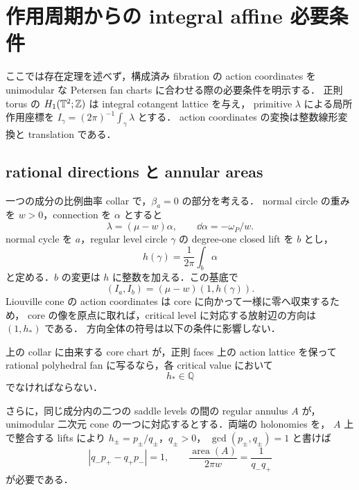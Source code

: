 \section{作用周期からの integral affine 必要条件}
\label{trop:action-conditions-section}

ここでは存在定理を述べず，構成済み fibration の action coordinates を
unimodular な Petersen fan charts に合わせる際の必要条件を明示する．
正則 torus の $H_1(\mathbb T^2;\mathbb Z)$ は integral cotangent lattice を与え，
primitive $\lambda$ による局所作用座標を
$I_\gamma=(2\pi)^{-1}\int_\gamma\lambda$ とする．
action coordinates の変換は整数線形変換と translation である．

\subsection{rational directions と annular areas}

一つの成分の比例曲率 collar で，$\beta_a=0$ の部分を考える．
normal circle の重みを $w>0$，connection を $\alpha$ とすると
\[
 \lambda=(\mu-w)\alpha,\qquad \dd\alpha=-\omega_P/w.
\]
normal cycle を $a$，regular level circle $\gamma$ の degree-one closed lift を $b$ とし，
\[
 h(\gamma)=\frac1{2\pi}\int_b\alpha
\]
と定める．$b$ の変更は $h$ に整数を加える．この基底で
\begin{equation}\label{trop:action-cone}
 (I_a,I_b)=(\mu-w)(1,h(\gamma)).
\end{equation}
Liouville cone の action coordinates は core に向かって一様に零へ収束するため，
core の像を原点に取れば，critical level に対応する放射辺の方向は $(1,h_*)$ である．
方向全体の符号は以下の条件に影響しない．

\begin{proposition}
\label{trop:farey-condition}
上の collar に由来する core chart が，正則 faces 上の action lattice を保って
rational polyhedral fan に写るなら，各 critical value において
\begin{equation}\label{trop:rational-slope}
 h_*\in\mathbb Q
\end{equation}
でなければならない．

さらに，同じ成分内の二つの saddle levels の間の regular annulus $A$ が，
unimodular 二次元 cone の一つに対応するとする．両端の holonomies を，
$A$ 上で整合する lifts により $h_\pm=p_\pm/q_\pm$，$q_\pm>0$，
$\gcd(p_\pm,q_\pm)=1$ と書けば
\begin{equation}\label{trop:farey-determinant}
 |q_-p_+-q_+p_-|=1,
 \qquad
 \frac{\operatorname{area}(A)}{2\pi w}=\frac1{q_-q_+}
\end{equation}
が必要である．
\end{proposition}

